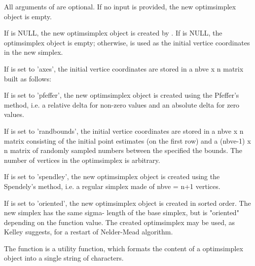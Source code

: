 %
\begin{Details}\relax
All arguments of  are optional. If no input is provided,
the new optimsimplex object is empty.

If  is NULL, the new optimsimplex object is created by
. If  is NULL, the optimsimplex object 
is empty; otherwise,  is used as the initial vertice coordinates
in the new simplex.

If  is set to 'axes', the initial vertice coordinates are stored 
in a nbve x n matrix built as follows:

If  is set to 'pfeffer', the new optimsimplex object is created 
using the Pfeffer's method, i.e. a relative delta for non-zero values and an 
absolute delta for zero values.

If  is set to 'randbounds', the initial vertice coordinates are 
stored in a nbve x n matrix consisting of the initial point estimates (on the 
first row) and a (nbve-1) x n matrix of randomly sampled numbers between the
specified the bounds. The number of vertices  in the optimsimplex 
is arbitrary.

If  is set to 'spendley', the new optimsimplex object is created 
using the Spendely's method, i.e. a regular simplex made of nbve = n+1 
vertices. 

If  is set to 'oriented', the new optimsimplex object is created 
in sorted order. The new simplex has the same sigma- length of the base 
simplex, but is "oriented" depending on the function value. The created 
optimsimplex may be used, as Kelley suggests, for a restart of Nelder-Mead 
algorithm.

The  function is a utility function, which formats
the content of a optimsimplex object into a single string of characters.

\end{Details}
%
